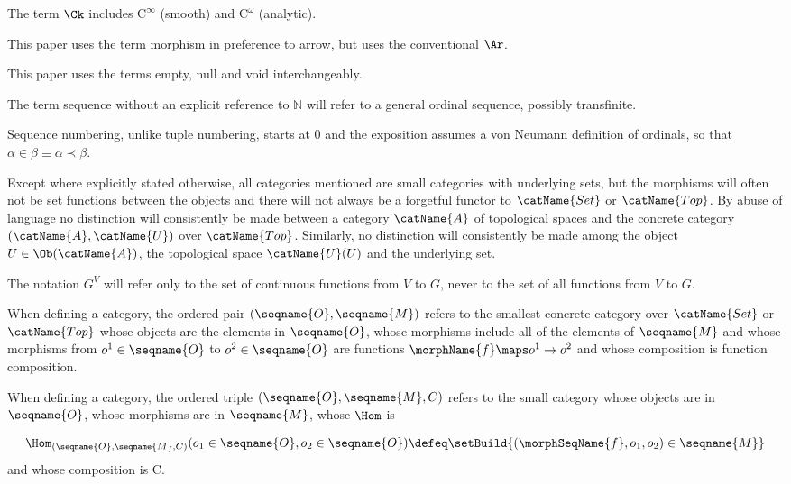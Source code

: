 \documentclass{article}
\begin{document}
The term $\Ck$ includes $\mathrm{C}^\infty$ (smooth) and
$\mathrm{C}^\omega$ (analytic).

This paper uses the term morphism in preference to arrow, but uses
the conventional $\Ar$.

This paper uses the terms empty, null and void interchangeably.

The term sequence without an explicit reference to $\mathbb{N}$
will refer to a general ordinal sequence, possibly transfinite.

Sequence numbering, unlike tuple numbering, starts at 0 and the
exposition assumes a von Neumann definition of ordinals, so that
$\alpha \in \beta \equiv \alpha \prec \beta$.

Except where explicitly stated otherwise, all categories mentioned are
small categories with underlying sets, but the morphisms will often not
be set functions between the objects and there will not always be a
forgetful functor to $\catName{Set}$ or $\catName{Top}$. By abuse of language no
distinction will consistently be made between a category $\catName{A}$
of topological spaces and the concrete category
$(\catName{A},\catName{U})$ over $\catName{Top}$.  Similarly, no distinction
will consistently be made among the object $U \in \Ob(\catName{A})$, the
topological space $\catName{U}(U)$ and the underlying set.

The notation $G^V$ will refer only to the set of continuous functions
from $V$ to $G$, never to the set of all functions from $V$ to $G$.

When defining a category, the ordered pair $(\seqname{O}, \seqname{M})$
refers to the smallest concrete category over $\catName{Set}$ or $\catName{Top}$
whose objects are the elements in $\seqname{O}$, whose morphisms include
all of the elements of $\seqname{M}$ and whose morphisms from
$o^1 \in \seqname{O}$ to $o^2 \in \seqname{O}$ are functions
$\morphName{f} \maps o^1 \to o^2$ and whose composition is function
composition.

When defining a category, the ordered triple
$(\seqname{O}, \seqname{M}, C)$ refers to the small category whose
objects are in $\seqname{O}$, whose morphisms are in $\seqname{M}$,
whose $\Hom$ is

\begin{equation}
\Hom_{(\seqname{O}, \seqname{M}, C)}
  (o_1 \in \seqname{O}, o_2 \in \seqname{O})
\defeq
\setBuild
  {
    (
      \morphSeqName{f},
      o_1,
      o_2
    )
    \in \seqname{M}
  }
\end{equation}
and whose composition is C.
\end{document}
